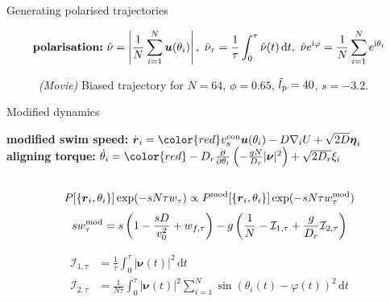 \documentclass{beamer}
\begin{document}
\begin{frame}{Generating polarised trajectories}

\begin{align*}
\text{\bf polarisation:}~ \hat{\nu} =\left|\frac{1}{N} \sum_{i=1}^N \boldsymbol{u}(\theta_i)\right|,~ \bar{\nu}_{\tau} = \frac{1}{\tau} \int_0^{\tau} \hat{\nu}(t) \, \text{d}t,~ \hat{\nu} e^{\mathrm{i}\varphi} = \frac{1}{N} \sum_{i=1}^N e^{\mathrm{i} \theta_i}
\end{align*}

\begin{figure}
\begin{minipage}{0.55\linewidth}
\centering
{}
\end{minipage}
\vspace{-15pt}
\caption{\textit{(Movie)} Biased trajectory for $N = 64$, $\phi = 0.65$, $\tilde{l}_{\rm p} = 40$, $s = -3.2$. }
\end{figure}

\end{frame}

\begin{frame}{Modified dynamics}

{\bf modified swim speed:} $\dot{\boldsymbol{r}}_i = {\color{red}v^{\rm con}_s} \boldsymbol{u}(\theta_i) - D \nabla_i U + \sqrt{2 D} \boldsymbol{\eta}_i$\\
{\bf aligning torque:} $\dot{\theta}_i = {\color{red}-D_r \frac{\partial}{\partial \theta_i} \left(- \frac{g N}{D_r} |\boldsymbol{\nu}|^2\right)} + \sqrt{2 D_r} \xi_i$\\
\mbox{}\\

\begin{align*}
P[\{\boldsymbol{r}_i, \theta_i\}] \exp(- s N \tau w_{\tau}) \propto P^{\rm mod}[\{\boldsymbol{r}_i, \theta_i\}] \exp(- s N \tau w^{\rm mod}_{\tau})
\end{align*}
\begin{align*}
s w^{\rm mod}_{\tau} = s \left(1 - \frac{s D}{v_0^2} + w_{f, \tau}\right) - g \left(\frac{1}{N} - \mathcal{I}_{1, \tau} + \frac{g}{D_r} \mathcal{I}_{2, \tau}\right)
\end{align*}

\begin{align*}
\mathcal{I}_{1, \tau} &= \frac{1}{\tau} \int_0^{\tau} |\boldsymbol{\nu}(t)|^2 \, \mathrm{d}t\\
\mathcal{I}_{2, \tau} &= \frac{1}{N \tau} \int_0^{\tau} |\boldsymbol{\nu}(t)|^2 \sum_{i=1}^N \sin(\theta_i(t) - \varphi(t))^2 \, \mathrm{d}t
\end{align*}

\end{frame}
\end{document}
